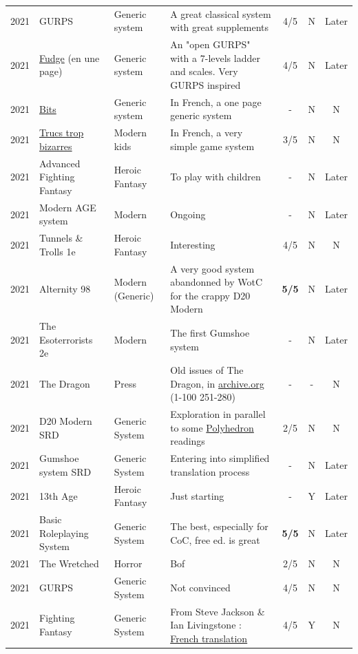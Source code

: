 \documentclass[a4paper, 11pt, twoside]{article}
\begin{document}
\begin{longtable}{cp{2cm}p{1.5cm}p{7cm}ccc}
2021 & GURPS & Generic system & A great classical system with great supplements & 4/5 & N & Later\\
2021 & \href{https://github.com/orey/jdr/blob/master/Fudge-fr/FudgeEnUnePage-ORey03.pdf}{Fudge} (en une page) & Generic system & An "open GURPS" with a 7-levels ladder and scales. Very GURPS inspired & 4/5 & N & Later\\
2021 & \href{http://komajdr.free.fr/fichiers/BiTs.rar}{Bits } & Generic system & In French, a one page generic system & - & N & N\\
2021 & \href{http://storygame.free.fr/}{Trucs trop bizarres} & Modern kids & In French, a very simple game system & 3/5 & N & N\\
2021 & Advanced Fighting Fantasy & Heroic Fantasy & To play with children & - & N & Later\\
2021 & Modern AGE system & Modern & Ongoing & - & N & Later\\
2021 & Tunnels \& Trolls 1e & Heroic Fantasy & Interesting & 4/5 & N & N\\
2021 & Alternity 98 & Modern (Generic) & A very good system abandonned by WotC for the crappy D20 Modern & \textbf{5/5} & N & Later\\
2021 & The Esoterrorists 2e & Modern & The first Gumshoe system & - & N & Later\\
2021 & The Dragon & Press & Old issues of The Dragon, in \href{https://archive.org/details/DragonMagazine045\_201903}{archive.org} (1-100 251-280) & - & - & N\\
2021 & D20 Modern SRD & Generic System & Exploration in parallel to some \href{https://archive.org/details/Polyhedron105}{Polyhedron} readings & 2/5 & N & N\\
2021 & Gumshoe system SRD & Generic System & Entering into simplified translation process & - & N & Later\\
2021 & 13th Age & Heroic Fantasy & Just starting & - & Y & Later\\
2021 & Basic Roleplaying System & Generic System & The best, especially for CoC, free ed. is great & \textbf{5/5} & N & Later\\
2021 & The Wretched & Horror & Bof & 2/5 & N & N\\
2021 & GURPS & Generic System & Not convinced & 4/5 & N & N\\
2021 & Fighting Fantasy & Generic System & From Steve Jackson \& Ian Livingstone : \href{https://github.com/orey/jdr/tree/master/FightingFantasys-fr}{French translation} & 4/5 & Y & N\\

\end{longtable}
\end{document}

